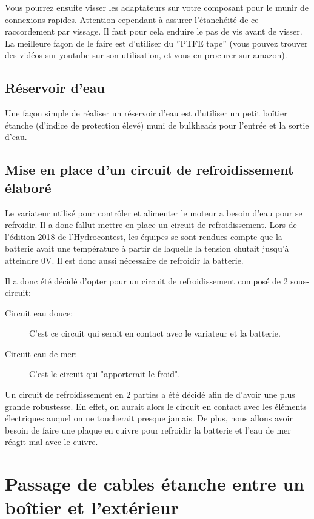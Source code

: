 \documentclass[a4paper, 11pt]{report}
\begin{document}
Vous pourrez ensuite visser les adaptateurs sur votre composant pour
le munir de connexions rapides. Attention cependant à assurer l'étanchéité
de ce raccordement par vissage. Il faut pour cela enduire le pas de
vis avant de visser. La meilleure façon de le faire est d'utiliser
du ''PTFE tape'' (vous pouvez trouver des vidéos sur youtube sur
son utilisation, et vous en procurer sur amazon).

\section{Réservoir d'eau}

Une façon simple de réaliser un réservoir d'eau est d'utiliser un
petit boîtier étanche (d'indice de protection élevé) muni de bulkheads
pour l'entrée et la sortie d'eau.

\section{Mise en place d'un circuit de refroidissement élaboré}
Le variateur utilisé pour contrôler et alimenter le moteur a besoin d'eau pour se refroidir. Il a donc fallut mettre en place un circuit de refroidissement.
Lors de l'édition 2018 de l'Hydrocontest, les équipes se sont rendues compte que la batterie avait une température à partir de laquelle la tension chutait jusqu'à atteindre 0V. Il est donc aussi nécessaire de refroidir la batterie.

Il a donc été décidé d'opter pour un circuit de refroidissement composé de 2 sous-circuit:
\begin{description}
\item[Circuit eau douce:]C'est ce circuit qui serait en contact avec le variateur et la batterie.
\item[Circuit eau de mer:]C'est le circuit qui "apporterait le froid".
\end{description}


Un circuit de refroidissement en 2 parties a été décidé afin de d'avoir une plus grande robustesse. En effet, on aurait alors le circuit en contact avec les éléments électriques auquel on ne toucherait presque jamais. De plus, nous allons avoir besoin de faire une plaque en cuivre pour refroidir la batterie et l'eau de mer réagit mal avec le cuivre.

\chapter{Passage de cables étanche entre un boîtier et l'extérieur}
\end{document}
